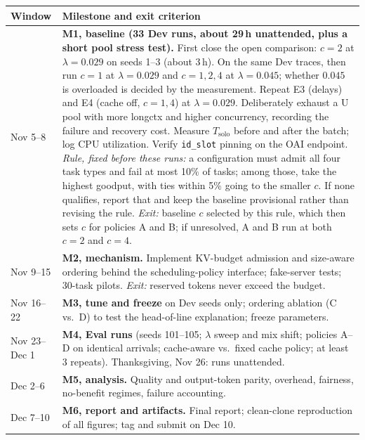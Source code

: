 \documentclass{article}
\begin{document}
\begin{center}
\footnotesize
\begin{tabular}{@{}p{1.0in}p{5.6in}@{}}
\toprule
Window & Milestone and exit criterion \\
\midrule
Nov 5--8 & \textbf{M1, baseline (33 Dev runs, about 29\,h unattended, plus a short pool stress test).} First close the open comparison: $c{=}2$ at $\lambda{=}0.029$ on seeds 1--3 (about 3\,h). On the same Dev traces, then run $c{=}1$ at $\lambda{=}0.029$ and $c{=}1,2,4$ at $\lambda{=}0.045$; whether $0.045$ is overloaded is decided by the measurement. Repeat E3 (delays) and E4 (cache off, $c{=}1,4$) at $\lambda{=}0.029$. Deliberately exhaust a U pool with more longctx and higher concurrency, recording the failure and recovery cost. Measure $T_{\mathrm{solo}}$ before and after the batch; log CPU utilization. Verify \texttt{id\_slot} pinning on the OAI endpoint. \emph{Rule, fixed before these runs:} a configuration must admit all four task types and fail at most 10\% of tasks; among those, take the highest goodput, with ties within 5\% going to the smaller $c$. If none qualifies, report that and keep the baseline provisional rather than revising the rule. \emph{Exit:} baseline $c$ selected by this rule, which then sets $c$ for policies A and B; if unresolved, A and B run at both $c{=}2$ and $c{=}4$. \\
Nov 9--15 & \textbf{M2, mechanism.} Implement KV-budget admission and size-aware ordering behind the scheduling-policy interface; fake-server tests; 30-task pilots. \emph{Exit:} reserved tokens never exceed the budget. \\
Nov 16--22 & \textbf{M3, tune and freeze} on Dev seeds only; ordering ablation (C vs.\ D) to test the head-of-line explanation; freeze parameters. \\
Nov 23--Dec 1 & \textbf{M4, Eval runs} (seeds 101--105; $\lambda$ sweep and mix shift; policies A--D on identical arrivals; cache-aware vs.\ fixed cache policy; at least 3 repeats). Thanksgiving, Nov 26: runs unattended. \\
Dec 2--6 & \textbf{M5, analysis.} Quality and output-token parity, overhead, fairness, no-benefit regimes, failure accounting. \\
Dec 7--10 & \textbf{M6, report and artifacts.} Final report; clean-clone reproduction of all figures; tag and submit on Dec 10. \\
\bottomrule
\end{tabular}
\end{center}
\end{document}
